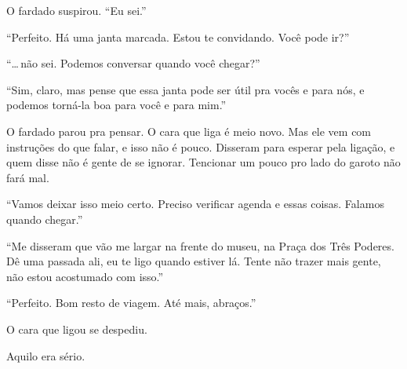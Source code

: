 O fardado suspirou. ``Eu sei.''

``Perfeito. Há uma janta marcada. Estou te convidando. Você pode ir?''

``\ldots\,não sei. Podemos conversar quando você chegar?''

``Sim, claro, mas pense que essa janta pode ser útil pra vocês e para nós, e podemos torná-la boa para você e para mim.''

O fardado parou pra pensar. O cara que liga é meio novo. Mas ele vem com instruções do que falar, e isso não é pouco. Disseram para esperar pela ligação, e quem disse não é gente de se ignorar. Tencionar um pouco pro lado do garoto não fará mal.

``Vamos deixar isso meio certo. Preciso verificar agenda e essas coisas. Falamos quando chegar.''

``Me disseram que vão me largar na frente do museu, na Praça dos Três Poderes. Dê uma passada ali, eu te ligo quando estiver lá. Tente não trazer mais gente, não estou acostumado com isso.''

``Perfeito. Bom resto de viagem. Até mais, abraços.''

O cara que ligou se despediu.

Aquilo era sério.
